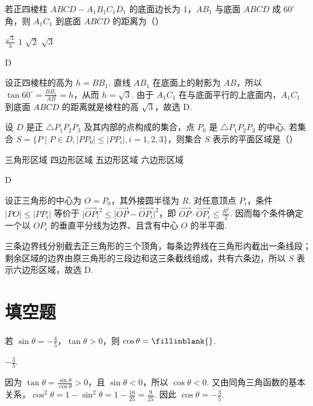 \begin{problem}
若正四棱柱 \(ABCD - A_{1}B_{1}C_{1}D_{1}\) 的底面边长为 \(1\)，\(AB_{1}\) 与底面 \(ABCD\) 成 \(60^{\circ}\) 角，则 \(A_{1}C_{1}\) 到底面 \(ABCD\) 的距离为（\quad）

\choices
    {\(\frac{\sqrt{3}}{3}\)}
    {\(1\)}
    {\(\sqrt{2}\)}
    {\(\sqrt{3}\)}
\begin{answer}
D
\end{answer}

\begin{solution}
设正四棱柱的高为 \(h=BB_1\). 直线 \(AB_1\) 在底面上的射影为 \(AB\)，所以 \(\tan60^{\circ}=\frac{BB_1}{AB}=h\)，从而 \(h=\sqrt{3}\). 由于 \(A_1C_1\) 在与底面平行的上底面内，\(A_1C_1\) 到底面 \(ABCD\) 的距离就是棱柱的高 \(\sqrt{3}\)，故选 D.
\end{solution}
\end{problem}

\begin{problem}
设 \(D\) 是正 \(\triangle P_{1}P_{2}P_{3}\) 及其内部的点构成的集合，点 \(P_{0}\) 是 \(\triangle P_{1}P_{2}P_{3}\) 的中心. 若集合 \(S = \{P \mid P \in D, |PP_{0}| \leqslant |PP_{i}|, i = 1, 2, 3\}\)，则集合 \(S\) 表示的平面区域是（\quad）

\choices
    {三角形区域}
    {四边形区域}
    {五边形区域}
    {六边形区域}
\begin{answer}
D
\end{answer}

\begin{solution}
设正三角形的中心为 \(O=P_0\)，其外接圆半径为 \(R\). 对任意顶点 \(P_i\)，条件 \(\lvert PO\rvert\leqslant\lvert PP_i\rvert\) 等价于 \(\lvert\overrightarrow{OP}\rvert^2\leqslant\lvert\overrightarrow{OP}-\overrightarrow{OP_i}\rvert^2\)，即 \(\overrightarrow{OP}\mathbin{\cdot}\overrightarrow{OP_i}\leqslant\frac{R^2}{2}\). 因而每个条件确定一个以 \(OP_i\) 的垂直平分线为边界、且含有中心 \(O\) 的半平面.

三条边界线分别截去正三角形的三个顶角，每条边界线在三角形内截出一条线段；剩余区域的边界由原三角形的三段边和这三条截线组成，共有六条边，所以 \(S\) 表示六边形区域，故选 D.
\end{solution}
\end{problem}

\section{填空题}

\begin{problem}
若 \(\sin \theta = -\frac{4}{5}\)，\(\tan \theta > 0\)，则 \(\cos \theta =\fillinblank{}\).
\begin{answer}
\(-\frac{3}{5}\).
\end{answer}

\begin{solution}
因为 \(\tan\theta=\frac{\sin\theta}{\cos\theta}>0\)，且 \(\sin\theta<0\)，所以 \(\cos\theta<0\). 又由同角三角函数的基本关系，\(\cos^2\theta=1-\sin^2\theta=1-\frac{16}{25}=\frac{9}{25}\). 因此 \(\cos\theta=-\frac{3}{5}\).
\end{solution}
\end{problem}

